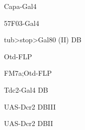 \documentclass[17pt]{extarticle}
\begin{document}
\footnotesize
\vspace*{\fill}
\newpage{}
\vspace*{\fill}\begin{large}
Capa-Gal4 \\[0.5em]
\end{large}
\footnotesize
\vspace*{\fill}
\newpage{}
\vspace*{\fill}\begin{large}
57F03-Gal4 \\[0.5em]
\end{large}
\footnotesize
\vspace*{\fill}
\newpage{}
\vspace*{\fill}\begin{footnotesize}
tub>stop>Gal80 (II) DB \\[0.5em]
\end{footnotesize}
\footnotesize
\vspace*{\fill}
\newpage{}
\vspace*{\fill}\begin{large}
Otd-FLP \\[0.5em]
\end{large}
\footnotesize
\vspace*{\fill}
\newpage{}
\vspace*{\fill}\begin{normalsize}
FM7a;Otd-FLP \\[0.5em]
\end{normalsize}
\footnotesize
\vspace*{\fill}
\newpage{}
\vspace*{\fill}\begin{normalsize}
Tdc2-Gal4 DB \\[0.5em]
\end{normalsize}
\footnotesize
\vspace*{\fill}
\newpage{}
\vspace*{\fill}\begin{normalsize}
UAS-Dcr2 DBIII \\[0.5em]
\end{normalsize}
\footnotesize
\vspace*{\fill}
\newpage{}
\vspace*{\fill}\begin{normalsize}
UAS-Dcr2 DBII \\[0.5em]
\end{normalsize}
\footnotesize
\vspace*{\fill}
\end{document}
